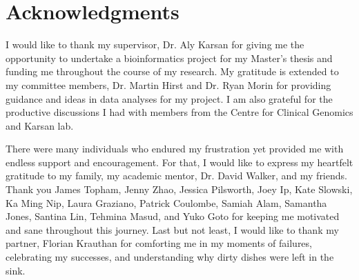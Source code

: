 
\chapter{Acknowledgments}

I would like to thank my supervisor, Dr. Aly Karsan for giving me the opportunity to undertake a bioinformatics project for my Master's thesis and funding me throughout the course of my research. My gratitude is extended to my committee members, Dr. Martin Hirst and Dr. Ryan Morin for providing guidance and ideas in data analyses for my project. I am also grateful for the productive discussions I had with members from the Centre for Clinical Genomics and Karsan lab.

There were many individuals who endured my frustration yet provided me with endless support and encouragement. For that, I would like to express my heartfelt gratitude to my family, my academic mentor, Dr. David Walker, and my friends. Thank you James Topham, Jenny Zhao, Jessica Pilsworth, Joey Ip, Kate Slowski, Ka Ming Nip, Laura Graziano, Patrick Coulombe, Samiah Alam, Samantha Jones, Santina Lin, Tehmina Masud, and Yuko Goto for keeping me motivated and sane throughout this journey. Last but not least, I would like to thank my partner, Florian Krauthan for comforting me in my moments of failures, celebrating my successes, and understanding why dirty dishes were left in the sink.
